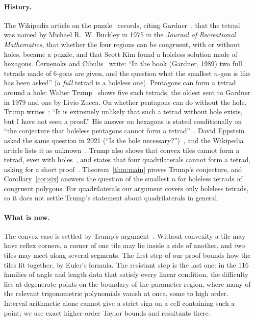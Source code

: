 \documentclass[11pt]{article}
\theoremstyle{definition}
\theoremstyle{remark}
\begin{document}
\paragraph{History.} The Wikipedia article on the puzzle~\cite{wiki}
records, citing Gardner~\cite{gardner}, that the tetrad was named by
Michael R.~W. Buckley in 1975 in the \emph{Journal of Recreational
Mathematics}, that whether the four regions can be congruent, with or
without holes, became a puzzle, and that Scott Kim found a holeless
solution made of hexagons. \v{C}er\c{n}enoks and Cibulis~\cite[Section~6, Problem~P1]{cc}
write: ``In the book (Gardner, 1989) two full tetrads made of 6-gons are
given, and the question what the smallest $n$-gon is like has been
asked'' (a \emph{full} tetrad is a holeless one). Pentagons can form a
tetrad around a hole: Walter Trump~\cite{trump14} shows five such tetrads,
the oldest sent to Gardner in 1979 and one by Livio Zucca. On whether
pentagons can do without the hole, Trump writes~\cite{trump14}: ``It is
extremely unlikely that such a tetrad without hole exists, but I have not
seen a proof.'' His answer on hexagons is stated conditionally on ``the
conjecture that holeless pentagons cannot form a tetrad''~\cite{trump15}.
David Eppstein asked the same question in 2021 (``Is the hole
necessary?'')~\cite{eppstein}, and the Wikipedia article lists it as
unknown~\cite{wiki}. Trump also shows that convex tiles cannot form a
tetrad, even with holes~\cite{trump18}, and states that four quadrilaterals
cannot form a tetrad, asking for a short proof~\cite{trump13}.
Theorem~\ref{thm:main} proves Trump's conjecture, and
Corollary~\ref{cor:six} answers the question of the smallest $n$ for
holeless tetrads of congruent polygons. For quadrilaterals our argument
covers only holeless tetrads, so it does not settle Trump's statement about
quadrilaterals in general.

\paragraph{What is new.} The convex case is settled by Trump's
argument~\cite{trump18}. Without convexity a tile may have reflex
corners, a corner of one tile may lie inside a side of another, and two
tiles may meet along several segments. The first step of our proof bounds how
the tiles fit together, by Euler's formula. The resistant step is the last one: in
the 116 families of angle and length data that satisfy every linear
condition, the difficulty lies at degenerate points on the boundary of the
parameter region, where many of the relevant trigonometric polynomials
vanish at once, some to high order. Interval arithmetic alone cannot give
a strict sign on a cell containing such a point; we use exact
higher-order Taylor bounds and resultants there.
\end{document}
